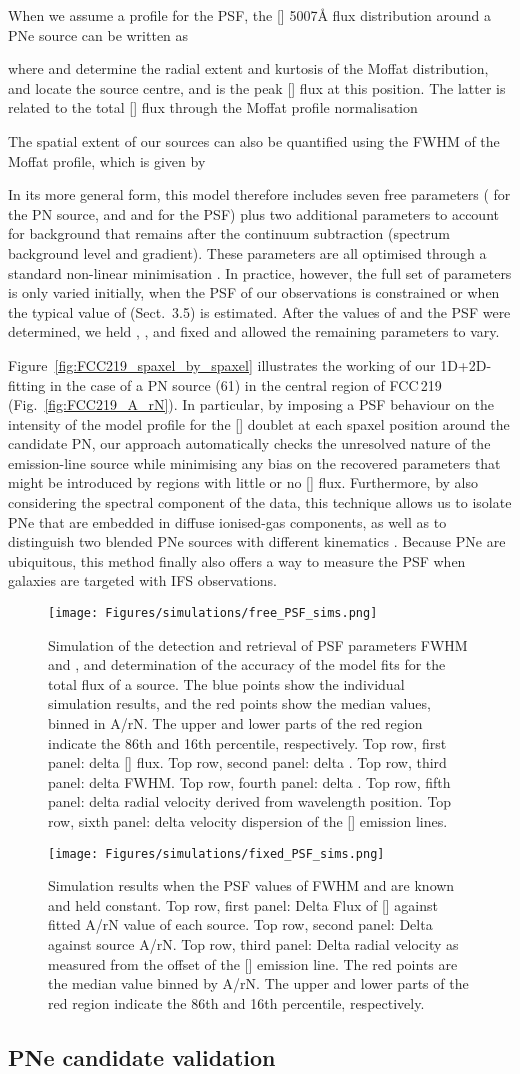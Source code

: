 \documentclass{aa}
\newcommand{\placefigfour}{
\begin{figure}
    \texttt{[image: Figures/simulations/free\_PSF\_sims.png]}
    \caption{Simulation of the detection and retrieval of PSF parameters FWHM and , and determination of the accuracy of the model fits for the total flux of a source. The blue points show the individual simulation results, and the red points show the median values, binned in A/rN. The upper and lower parts of the red region indicate the 86th and 16th percentile, respectively. Top row, first panel: delta [\ion{O}{iii}] flux. Top row, second panel: delta . Top row, third panel: delta FWHM. Top row, fourth panel: delta . Top row, fifth panel: delta radial velocity derived from wavelength position. Top row, sixth panel: delta velocity dispersion of the [\ion{O}{iii}] emission lines.}
    \label{fig:free_PSF_sims}
\end{figure}
}
\newcommand{\placefigfive}{
\begin{figure}
    \texttt{[image: Figures/simulations/fixed\_PSF\_sims.png]}
    \caption{Simulation results when the PSF values of FWHM and  are known and held constant. Top row, first panel: Delta Flux of [\ion{O}{iii}] against fitted A/rN value of each source. Top row, second panel: Delta  against source A/rN. Top row, third panel: Delta radial velocity as measured from the offset of the [\ion{O}{iii}] emission line. The red points are the median value binned by A/rN. The upper and lower parts of the red region indicate the 86th and 16th percentile, respectively.}
    \label{fig:fixed_PSF_sims}
\end{figure}
}
\begin{document}
When we assume a \citet{moffat_theoretical_1969} profile for the PSF, the [] 5007\AA{} flux distribution around a PNe source can be written as

where  and  determine the radial extent and kurtosis of the Moffat distribution,  and  locate the source centre, and  is the peak [] flux at this position. The latter is related to the total [] flux through the Moffat profile normalisation

The spatial extent of our sources can also be quantified using the FWHM of the Moffat profile, which is given by

In its more general form, this model therefore includes seven free parameters ( for the PN source, and  and  for the PSF) plus two additional parameters to account for background that remains after the continuum subtraction (spectrum background level and gradient). These parameters are all optimised through a standard non-linear  minimisation \citep{newville_lmfit_2014, newville_lmfitlmfit-py_2019}.
In practice, however, the full set of parameters is only varied initially, when the PSF of our observations is constrained or when the typical value of  (Sect.~3.5) is estimated. After the values of  and the PSF were determined, we held , , and  fixed and allowed the remaining parameters to vary.

Figure~\ref{fig:FCC219_spaxel_by_spaxel} illustrates the working of our 1D+2D-fitting in the case of a PN source (61) in the central region of FCC\,219 (Fig.~\ref{fig:FCC219_A_rN}). In particular, by imposing a PSF behaviour on the intensity of the model profile for the [] doublet at each spaxel position around the candidate PN, our approach automatically checks the unresolved nature of the emission-line source while minimising any bias on the recovered parameters that might be introduced by regions with little or no [] flux. Furthermore, by also considering the spectral component of the data, this technique allows us to isolate PNe that are embedded in diffuse ionised-gas components, as well as to distinguish two blended PNe sources with different kinematics \citep[see e.g.][]{pastorello_planetary_2013}. Because PNe are ubiquitous, this method finally also offers a way to measure the PSF when galaxies are targeted with IFS observations.

\placefigfour
\placefigfive

\subsection{PNe candidate validation}
\end{document}
